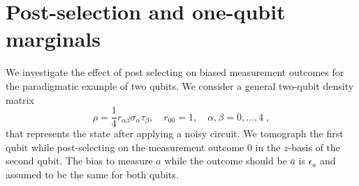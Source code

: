 \documentclass[two column]{article}
\begin{document}
\section{Post-selection and one-qubit marginals}\label{app:marg}
We investigate the effect of post selecting on biased measurement outcomes for the paradigmatic example of two qubits. We consider a general two-qubit density matrix
\begin{equation}
	\rho=\frac{1}{4} r_{\alpha \beta} \sigma_\alpha \tau_\beta,\quad r_{00}=1,\quad \alpha,\beta=0,\ldots,4\;,
\end{equation} that represents the state after applying a noisy circuit. We tomograph the first qubit while post-selecting on the measurement outcome $0$ in the $z$-basis of the second qubit. The bias to measure $a$ while the outcome should be $\bar a$ is $\epsilon_a$ and assumed to be the same for both qubits. 
\end{document}
